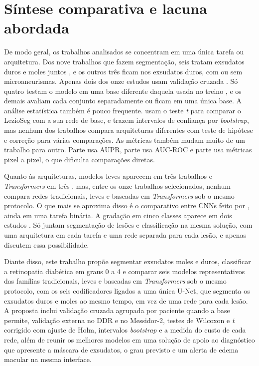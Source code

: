 \section{Síntese comparativa e lacuna abordada}
\label{sec:rel-sintese}

De modo geral, os trabalhos analisados se concentram em uma única tarefa ou arquitetura. Dos nove trabalhos que fazem segmentação, seis tratam exsudatos duros e moles juntos \cite{huang2022rtnet,yin2023dbunet,wan2021eadnet,ali2023lezioseg,zheng2024cascade,boumeshed2026modular}, e os outros três ficam nos exsudatos duros, com ou sem microaneurismas. Apenas dois dos onze estudos usam validação cruzada \cite{kou2020erunet,ma2024hard}. Só quatro testam o modelo em uma base diferente daquela usada no treino \cite{huang2022rtnet,ali2023lezioseg,naveen2025effnet,boumeshed2026modular}, e os demais avaliam cada conjunto separadamente ou ficam em uma única base. A análise estatística também é pouco frequente.  usam o teste \textit{t} para comparar o LezioSeg com a sua rede de base, e  trazem intervalos de confiança por \textit{bootstrap}, mas nenhum dos trabalhos compara arquiteturas diferentes com teste de hipótese e correção para várias comparações. As métricas também mudam muito de um trabalho para outro. Parte usa AUPR, parte usa AUC-ROC e parte usa métricas pixel a pixel, o que dificulta comparações diretas.

Quanto às arquiteturas, modelos leves aparecem em três trabalhos \cite{ali2023lezioseg,naveen2025effnet,boumeshed2026modular} e \textit{Transformers} em três \cite{huang2022rtnet,zheng2024cascade,yang2024tmil}, mas, entre os onze trabalhos selecionados, nenhum compara redes tradicionais, leves e baseadas em \textit{Transformers} sob o mesmo protocolo. O que mais se aproxima disso é o comparativo entre CNNs feito por , ainda em uma tarefa binária. A gradação em cinco classes aparece em dois estudos \cite{yang2024tmil,boumeshed2026modular}. Só  juntam segmentação de lesões e classificação na mesma solução, com uma arquitetura em cada tarefa e uma rede separada para cada lesão, e  apenas discutem essa possibilidade.

Diante disso, este trabalho propõe segmentar exsudatos moles e duros, classificar a retinopatia diabética em graus 0 a 4 e comparar seis modelos representativos das famílias tradicionais, leves e baseadas em \textit{Transformers} sob o mesmo protocolo, com os seis codificadores ligados a uma única U-Net, que segmenta os exsudatos duros e moles ao mesmo tempo, em vez de uma rede para cada lesão. A proposta inclui validação cruzada agrupada por paciente quando a base permite, validação externa no DDR e no Messidor-2, testes de Wilcoxon e \textit{t} corrigido com ajuste de Holm, intervalos \textit{bootstrap} e a medida do custo de cada rede, além de reunir os melhores modelos em uma solução de apoio ao diagnóstico que apresente a máscara de exsudatos, o grau previsto e um alerta de edema macular na mesma interface.
